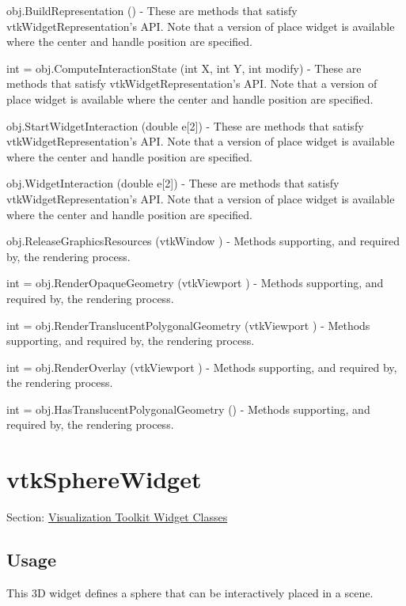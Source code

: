 \begin{DoxyItemize}
\item {\ttfamily obj.\-Build\-Representation ()} -\/ These are methods that satisfy vtk\-Widget\-Representation's A\-P\-I. Note that a version of place widget is available where the center and handle position are specified.  
\item {\ttfamily int = obj.\-Compute\-Interaction\-State (int X, int Y, int modify)} -\/ These are methods that satisfy vtk\-Widget\-Representation's A\-P\-I. Note that a version of place widget is available where the center and handle position are specified.  
\item {\ttfamily obj.\-Start\-Widget\-Interaction (double e\mbox{[}2\mbox{]})} -\/ These are methods that satisfy vtk\-Widget\-Representation's A\-P\-I. Note that a version of place widget is available where the center and handle position are specified.  
\item {\ttfamily obj.\-Widget\-Interaction (double e\mbox{[}2\mbox{]})} -\/ These are methods that satisfy vtk\-Widget\-Representation's A\-P\-I. Note that a version of place widget is available where the center and handle position are specified.  
\item {\ttfamily obj.\-Release\-Graphics\-Resources (vtk\-Window )} -\/ Methods supporting, and required by, the rendering process.  
\item {\ttfamily int = obj.\-Render\-Opaque\-Geometry (vtk\-Viewport )} -\/ Methods supporting, and required by, the rendering process.  
\item {\ttfamily int = obj.\-Render\-Translucent\-Polygonal\-Geometry (vtk\-Viewport )} -\/ Methods supporting, and required by, the rendering process.  
\item {\ttfamily int = obj.\-Render\-Overlay (vtk\-Viewport )} -\/ Methods supporting, and required by, the rendering process.  
\item {\ttfamily int = obj.\-Has\-Translucent\-Polygonal\-Geometry ()} -\/ Methods supporting, and required by, the rendering process.  
\end{DoxyItemize}\hypertarget{vtkwidgets_vtkspherewidget}{}\section{vtk\-Sphere\-Widget}\label{vtkwidgets_vtkspherewidget}
Section\-: \hyperlink{sec_vtkwidgets}{Visualization Toolkit Widget Classes} \hypertarget{vtkwidgets_vtkxyplotwidget_Usage}{}\subsection{Usage}\label{vtkwidgets_vtkxyplotwidget_Usage}
This 3\-D widget defines a sphere that can be interactively placed in a scene.

